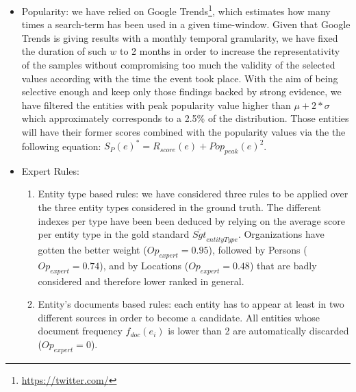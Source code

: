 \documentclass{llncs}
\begin{document}
\begin{itemize}
\item Popularity: we have relied on Google Trends\footnote{\url{https://twitter.com/}}, which estimates how many times a search-term has been used in a given time-window.
Given that Google Trends is giving results with a monthly temporal granularity, we have fixed the duration of such $w$ to 2 months in order to increase the representativity of the samples without compromising too much the validity of the selected values according with the time the event took place. With the aim of being selective enough and keep only those findings backed by strong evidence, we have filtered the entities with peak popularity value higher than $\mu+2*\sigma$ which approximately corresponds to a 2.5\% of the distribution. Those entities will have their former scores combined with the popularity values via the the following equation: $S_{P}\left ( e \right )^{*} =  R_{score}\left ( e \right ) +Pop_{peak}(e)^{2} $.
\item Expert Rules: 
\begin{enumerate}
\item Entity type based rules: we have considered three rules to be applied over the three entity types considered in the ground truth. The different indexes per type have been been deduced by relying on the average score per entity type in the gold standard $\overline{Sgt}_{entityType}$. 
Organizations have gotten the better weight ($Op _{expert}=0.95$), followed by Persons ($Op _{expert}=0.74$), and by Locations ($Op _{expert}=0.48$) that are badly considered and therefore lower ranked in general.
\item Entity's documents based rules: each entity has to appear at least in two different sources in order to become a candidate. All entities whose document frequency $f_{doc}(e_i)$ is lower than 2 are automatically discarded ($Op _{expert} = 0$).
\end{enumerate}
\end{itemize}
\end{document}

